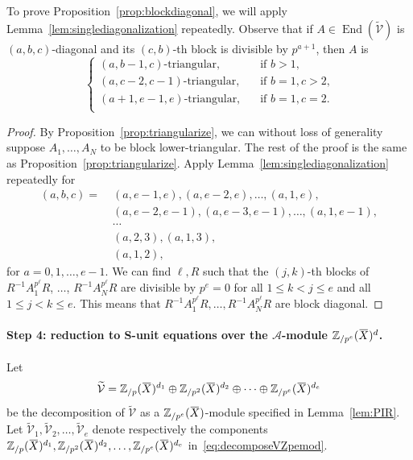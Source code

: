 \documentclass[letterpaper, 11pt, thm-restate]{article}
\numberwithin{equation}{section}
\newcommand{\Zpe}{\mathbb{Z}_{/p^e}}
\newcommand{\Zp}{\mathbb{Z}_{/p}}
\newcommand{\Zpt}{\mathbb{Z}_{/p^2}}
\newcommand{\End}{\operatorname{End}}
\newcommand{\mA}{\mathcal{A}}
\newcommand{\tmV}{\widetilde{\mathcal{V}}}
\newcommand{\oX}{\mkern 1.5mu\overline{\mkern-1.5mu X \mkern-1.5mu}\mkern 1.5mu}
\theoremstyle{definition}
\theoremstyle{definition}
\theoremstyle{definition}
\begin{document}
To prove Proposition~\ref{prop:blockdiagonal}, we will apply Lemma~\ref{lem:singlediagonalization} repeatedly.
Observe that if $A \in \End(\tmV)$ is $(a, b, c)$-diagonal and its $(c,b)$-th block is divisible by $p^{a+1}$, then $A$ is
\[
\begin{cases}
    \text{$(a, b-1, c)$-triangular,} \quad & \text{if $b > 1$,} \\
    \text{$(a, c-2, c-1)$-triangular,} \quad & \text{if $b = 1, c > 2$,} \\
    \text{$(a+1, e-1, e)$-triangular,} \quad & \text{if $b = 1, c = 2$.} \\
\end{cases}
\]

\propblockdiagonal*
\begin{proof}
    By Proposition~\ref{prop:triangularize}, we can without loss of generality suppose $A_1, \ldots, A_N$ to be block lower-triangular.
    The rest of the proof is the same as Proposition~\ref{prop:triangularize}.
    Apply Lemma~\ref{lem:singlediagonalization} repeatedly for
    \begin{align*}
    (a, b, c) = \; & (a, e-1, e), (a, e-2, e), \ldots, (a, 1, e), \\
    & (a, e-2, e-1), (a, e-3, e-1), \ldots, (a, 1, e-1), \\
    & \cdots \\
    & (a, 2, 3), (a, 1, 3), \\
    & (a, 1, 2),
    \end{align*}
    for $a = 0, 1, \ldots, e-1$. We can find $\ell, R$ such that the $(j,k)$-th blocks of $R^{-1}A_1^{p^{\ell}}R$, $\ldots$, $R^{-1}A_N^{p^{\ell}}R$ are divisible by $p^e = 0$ for all $1 \leq k < j \leq e$ and all $1 \leq j < k \leq e$.
    This means that $R^{-1}A_1^{p^{\ell}}R, \ldots, R^{-1}A_N^{p^{\ell}}R$ are block diagonal.
\end{proof}

\paragraph{Step 4: reduction to S-unit equations over the $\mA$-module $\Zpe(\oX)^d$.}

Let
\begin{equation}\label{eq:decomposeVZpemod}
\tmV = \Zp(\oX)^{d_1} \oplus \Zpt(\oX)^{d_2} \oplus \cdots \oplus \Zpe(\oX)^{d_e}
\end{equation}
be the decomposition of $\tmV$ as a $\Zpe(\oX)$-module specified in Lemma~\ref{lem:PIR}.
Let $\tmV_1, \tmV_2, \ldots, \tmV_e$ denote respectively the components $\Zp(\oX)^{d_1}, \Zpt(\oX)^{d_2}, \ldots, \Zpe(\oX)^{d_e}$ in~\eqref{eq:decomposeVZpemod}.
\end{document}
